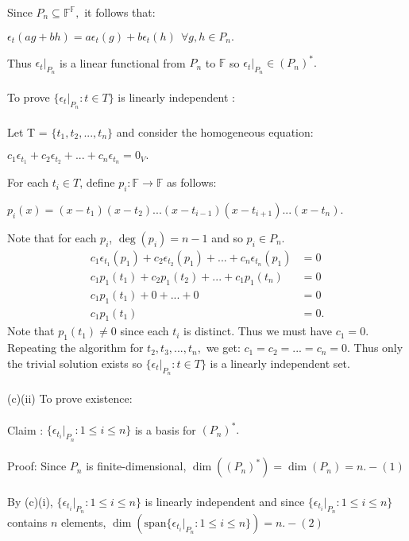 \documentclass{article}
\begin{document}
Since $P_n \subseteq \mathbb{F}^\mathbb{F},$ it follows that:\begin{center}
$\epsilon_t(ag + bh) = a\epsilon_t(g) + b\epsilon_t(h)\ \ \forall g,h\in P_n.$    
\end{center}
Thus $\epsilon_t|_{P_n}$ is a linear functional from $P_n$ to $\mathbb{F}$ so $\epsilon_t|_{P_n} \in (P_n)^*.$\\\\
To prove $\{\epsilon_t|_{P_n} : t\in T\}$ is linearly independent :\\\\
Let T = $\{t_1,t_2,...,t_n\}$ and consider the homogeneous equation: \begin{center}
     $c_1\epsilon_{t_1} + c_2\epsilon_{t_2} + ... + c_n\epsilon_{t_n} = 0_V.$
\end{center}
For each $t_i \in T$, define $p_i:\mathbb{F} \to \mathbb{F} $ as follows:\begin{center}
    $p_i(x) = (x - t_1)(x - t_2) ... (x - t_{i-1})(x - t_{i+1})...(x - t_n).$
\end{center}
Note that for each $p_i$,  $\deg(p_i) = n-1$ and so $p_i\in P_n.$\begin{align*}
    c_1\epsilon_{t_1}(p_1) + c_2\epsilon_{t_2}(p_1) + ... + c_n\epsilon_{t_n}(p_1) &= 0\\
    c_1p_1(t_1) + c_2p_1(t_2) + ... + c_1p_1(t_n) &= 0 \\
    c_1p_1(t_1) + 0 + ... + 0 &= 0\\
    c_1p_1(t_1) &= 0.
\end{align*}
Note that $p_1(t_1) \neq 0 $ since each $t_i$ is distinct. Thus we must have $c_1 = 0.$ Repeating the algorithm for $t_2, t_3,...,t_n,$ we get: $c_1 = c_2 = ... = c_n = 0.$ Thus only the trivial solution exists so $\{\epsilon_t|_{P_n} : t \in T\}$ is a linearly independent set. \\\\
(c)(ii) To prove existence:\\\\
Claim : $\{\epsilon_{t_i}|_{P_n} : 1 \leq i \leq n\}$ is a basis for $(P_n)^*.$\\\\
Proof:
Since $P_n$ is finite-dimensional, $\dim((P_n)^*) = \dim(P_n) = n. - (1)$\\\\
By (c)(i), $\{\epsilon_{t_i}|_{P_n} : 1 \leq i \leq n\}$ is linearly independent and since $\{\epsilon_{t_i}|_{P_n} : 1 \leq i \leq n\}$ contains $n$ elements, $\dim(\text{span}\{\epsilon_{t_i}|_{P_n} : 1 \leq i \leq n\}) = n. - (2)$\\\\
\end{document}
